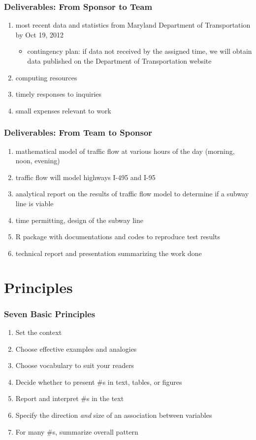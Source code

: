 \documentclass[compress,handout,10pt]{beamer}
\let\olditem\item
\renewcommand{\item}{\setlength{\itemsep}{0.5\baselineskip}\olditem}
\begin{document}
\begin{frame}
    \frametitle{Deliverables: From Sponsor to Team}
    \begin{enumerate}
        \item most recent data and statistics from Maryland Department of Transportation by Oct 19, 2012
	\begin{itemize}
		\item contingency plan: if data not received by the assigned time, we will obtain data published on the Department of Transportation website
	\end{itemize}
	\item computing resources
	\item timely responses to inquiries
	\item small expenses relevant to work
    \end{enumerate}
\end{frame}

\begin{frame}
    \frametitle{Deliverables: From Team to Sponsor}
    \begin{enumerate}
        \item mathematical model of traffic flow at various hours of the day (morning, noon, evening)
	\item traffic flow will model highways I-495 and I-95
	\item analytical report on the results of traffic flow model to determine if a subway line is viable
	\item time permitting, design of the subway line
	\item R package with documentations and codes to reproduce test results
	\item technical report and presentation summarizing the work done
    \end{enumerate}
\end{frame}

\section{Principles}
\begin{frame}
    \frametitle{Seven Basic Principles}
     \begin{enumerate}
         \item Set the context 
         \item Choose effective examples and analogies
         \item Choose vocabulary to suit your readers
         \item Decide whether to present \#s in text, tables, or figures
         \item Report and interpret \#s in the text
         \item Specify the direction \emph{and} size of an association between variables
         \item For many \#s, summarize overall pattern 
     \end{enumerate}
\end{frame}
\end{document}
